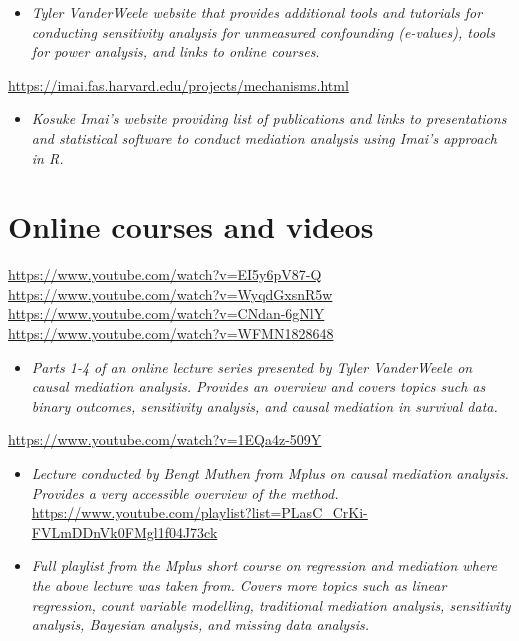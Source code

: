 \documentclass[
]{book}
\providecommand{\tightlist}{%
  \setlength{\itemsep}{0pt}\setlength{\parskip}{0pt}}
\begin{document}
\begin{itemize}
\tightlist
\item
  \emph{Tyler VanderWeele website that provides additional tools and tutorials for conducting sensitivity analysis for unmeasured confounding (e-values), tools for power analysis, and links to online courses}.
\end{itemize}

\url{https://imai.fas.harvard.edu/projects/mechanisms.html}

\begin{itemize}
\tightlist
\item
  \emph{Kosuke Imai's website providing list of publications and links to presentations and statistical software to conduct mediation analysis using Imai's approach in R.}
\end{itemize}

\hypertarget{online-courses-and-videos-2}{%
\section{Online courses and videos}\label{online-courses-and-videos-2}}

\url{https://www.youtube.com/watch?v=EI5y6pV87-Q}
\url{https://www.youtube.com/watch?v=WyqdGxsnR5w}
\url{https://www.youtube.com/watch?v=CNdan-6gNlY}
\url{https://www.youtube.com/watch?v=WFMN1828648}

\begin{itemize}
\tightlist
\item
  \emph{Parts 1-4 of an online lecture series presented by Tyler VanderWeele on causal mediation analysis. Provides an overview and covers topics such as binary outcomes, sensitivity analysis, and causal mediation in survival data.}
\end{itemize}

\url{https://www.youtube.com/watch?v=1EQa4z-509Y}

\begin{itemize}
\item
  \emph{Lecture conducted by Bengt Muthen from Mplus on causal mediation analysis. Provides a very accessible overview of the method.}
  \url{https://www.youtube.com/playlist?list=PLasC_CrKi-FVLmDDnVk0FMgl1f04J73ck}
\item
  \emph{Full playlist from the Mplus short course on regression and mediation where the above lecture was taken from. Covers more topics such as linear regression, count variable modelling, traditional mediation analysis, sensitivity analysis, Bayesian analysis, and missing data analysis.}
\end{itemize}
\end{document}
